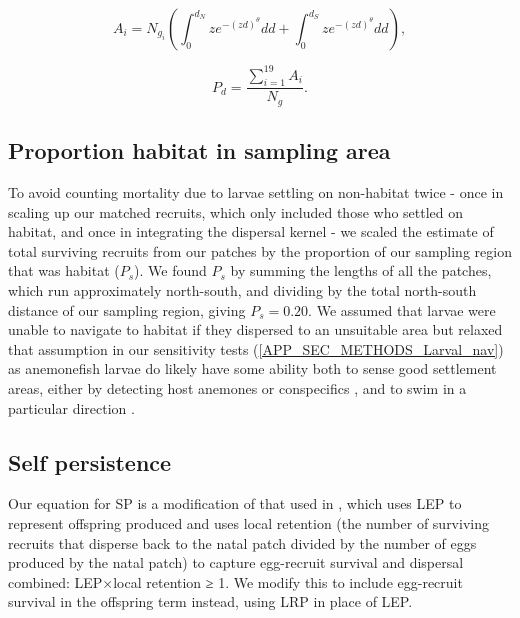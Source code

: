\documentclass[12pt, oneside]{article}   	%
\begin{document}
\begin{equation} 
A_i = N_{g_i} \left( \int_{0}^{d_N} z e^{-(zd)^\theta}  dd + \int_{0}^{d_S} z e^{-(zd)^\theta}  dd \right), \label{EQN_DK_area_within_sampling_region}
\end{equation}

\begin{equation}
P_d = \frac{\sum_{i=1}^{19} A_i}{N_g}.
\end{equation}

\subsection{Proportion habitat in sampling area} \label{APP_SEC_PropHabInSampledRegion}

To avoid counting mortality due to larvae settling on non-habitat twice - once in scaling up our matched recruits, which only included those who settled on habitat, and once in integrating the dispersal kernel - we scaled the estimate of total surviving recruits from our patches by the proportion of our sampling region that was habitat ($P_s$). We found $P_s$ by summing the lengths of all the patches, which run approximately north-south, and dividing by the total north-south distance of our sampling region, giving $P_s = 0.20$. We assumed that larvae were unable to navigate to habitat if they dispersed to an unsuitable area but relaxed that assumption in our sensitivity tests (\ref{APP_SEC_METHODS_Larval_nav}) as anemonefish larvae do likely have some ability both to sense good settlement areas, either by detecting host anemones \citep{elliott1995host, arvedlund1999host} or conspecifics \citep[e.g.][for coral reef fish more broadly]{lecchini2005experimental}, and to swim in a particular direction \citep[e.g.][]{bellwood2001relative, fisher2005swimming}.

\subsection{Self persistence}

Our equation for SP is a modification of that used in \cite{burgess2014beyond}, which uses LEP to represent offspring produced and uses local retention (the number of surviving recruits that disperse back to the natal patch divided by the number of eggs produced by the natal patch) to capture egg-recruit survival and dispersal combined: LEP×local retention ≥ 1. We modify this to include egg-recruit survival in the offspring term instead, using LRP in place of LEP.
\end{document}
